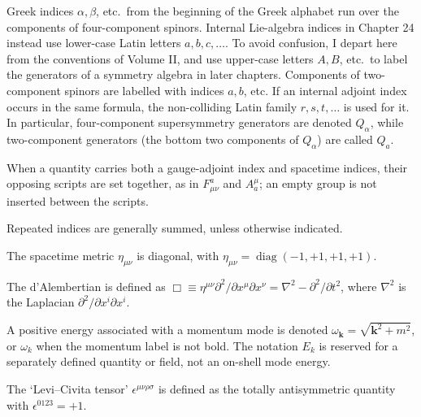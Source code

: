 Greek indices \(\alpha,\beta\), etc.\ from the beginning of the Greek alphabet
run over the components of four-component spinors. Internal Lie-algebra
indices in Chapter 24 instead use lower-case Latin letters \(a,b,c,\ldots\).
To avoid confusion, I depart here from the conventions of Volume II, and use
upper-case letters \(A,B\), etc.\ to label the generators of a symmetry
algebra in later chapters. Components of two-component spinors are labelled
with indices \(a,b\), etc. If an internal adjoint index occurs in the same
formula, the non-colliding Latin family \(r,s,t,\ldots\) is used for it. In
particular, four-component supersymmetry generators are denoted \(Q_\alpha\),
while two-component generators (the bottom two components of \(Q_\alpha\))
are called \(Q_a\).

When a quantity carries both a gauge-adjoint index and spacetime indices,
their opposing scripts are set together, as in
\(F^a_{\mu\nu}\) and \(A_a^\mu\);
an empty group is not inserted between the scripts.

Repeated indices are generally summed, unless otherwise indicated.

The spacetime metric \(\eta_{\mu\nu}\) is diagonal, with
\(\eta_{\mu\nu}=\operatorname{diag}(-1,+1,+1,+1)\).

The d'Alembertian is defined as
\(\Box\equiv\eta^{\mu\nu}\partial^2/\partial x^\mu\partial x^\nu
=\nabla^2-\partial^2/\partial t^2\), where \(\nabla^2\) is the Laplacian
\(\partial^2/\partial x^i\partial x^i\).

A positive energy associated with a momentum mode is denoted
\(\omega_{\mathbf{k}}=\sqrt{\mathbf{k}^2+m^2}\), or \(\omega_k\) when the
momentum label is not bold. The notation \(E_k\) is reserved for a separately
defined quantity or field, not an on-shell mode energy.

The `Levi--Civita tensor' \(\epsilon^{\mu\nu\rho\sigma}\) is defined as the
totally antisymmetric quantity with \(\epsilon^{0123}=+1\).

